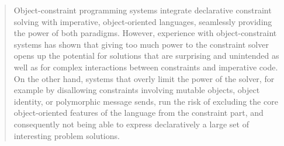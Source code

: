 \documentclass[10pt,reprint]{sigplanconf-preprint}
\begin{document}
\begin{abstract}
  Object-constraint programming systems integrate declarative
  constraint solving with imperative, object-oriented languages,
  seamlessly providing the power of both paradigms. %
  However, experience with object-constraint systems %
  has shown that giving too much power to
  the constraint solver opens up the potential for solutions that are
  surprising and unintended as well as for complex interactions 
  between constraints and
  imperative code. 
  On the other hand, systems that overly limit the power of the solver, for
  example by disallowing constraints involving mutable objects, object
  identity, or polymorphic message sends, run the risk of excluding the 
  core object-oriented features of the language from the constraint
  part, and consequently not being
  able to express declaratively a large set of interesting problem solutions.



\end{abstract}
\end{document}
